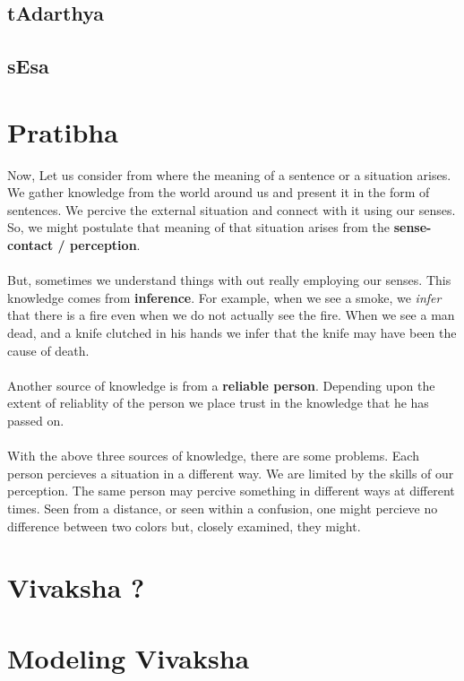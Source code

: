 \documentclass[a4paper,10pt]{article}
\begin{document}
  \subsection{tAdarthya}
  \subsection{sEsa}

\newpage 
\section{Pratibha}
Now, Let us consider from where the meaning of a sentence or a situation arises. 
We gather knowledge from the world around us and present it in the form of sentences.
We percive the external situation and connect with it using our senses. 
So, we might postulate that meaning of that situation arises from the \textbf{sense-contact / perception}.

\paragraph{} But, sometimes we understand things with out really employing our senses. 
This knowledge comes from \textbf{inference}.
For example, when we see a smoke, we \textit{infer} that there is a fire even when we do not actually see the fire. 
When we see a man dead, and a knife clutched in his hands we infer that the knife may have been the cause of death.

\paragraph{} Another source of knowledge is from a \textbf{reliable person}. 
Depending upon the extent of reliablity of the person we place trust in the knowledge that he has passed on.

\paragraph{} With the above three sources of knowledge, there are some problems. Each person percieves a situation in a different way. 
We are limited by the skills of our perception. The same person may percive something in different ways at different times. 
Seen from a distance, or seen within a confusion, one might percieve no difference between two colors but, closely examined, they might.


\newpage
\section{Vivaksha ?}
\newpage
\section{Modeling Vivaksha}
\end{document}
